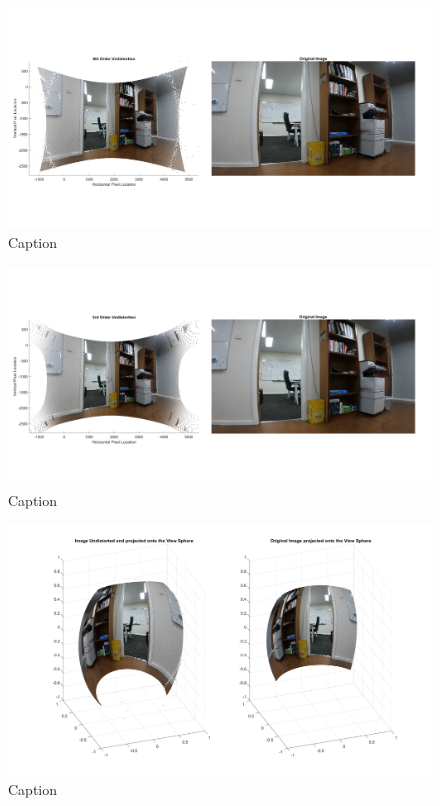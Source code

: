 \documentclass{UoNMCHA}
\numberwithin{equation}{section}
\begin{document}
\begin{figure}[ht]
    \begin{center}
        \includegraphics[width=.8\linewidth]{Figures/Matlab/6rdOrderUndistort}
        \caption{Caption}
        \label{fig:6rdOrderUndistort}
    \end{center}
\end{figure}
\begin{figure}[ht]
    \begin{center}
        \includegraphics[width=.8\linewidth]{Figures/Matlab/3rdOrderUndistort}
        \caption{Caption}
        \label{fig:3rdOrderUndistort}
    \end{center}
\end{figure}
\begin{figure}[ht]
    \begin{center}
        \includegraphics[width=.8\linewidth]{Figures/Matlab/Image_on_ViewSphere}
        \caption{Caption}
        \label{fig:Image_on_ViewSphere}
    \end{center}
\end{figure}
\newpage
\end{document}
